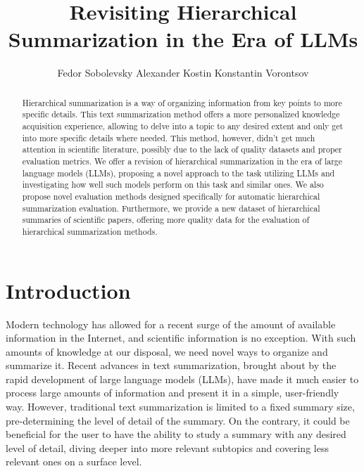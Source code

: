\documentclass[11pt,a4paper]{article}
\title{\LARGE \bf
Revisiting Hierarchical Summarization in the Era of LLMs
}
\author{
  Fedor Sobolevsky \And Alexander Kostin \And Konstantin Vorontsov
}
\begin{document}
\maketitle


\begin{abstract}

Hierarchical summarization is a way of organizing information from key points to more specific details. This text summarization method offers a more personalized knowledge acquisition experience, allowing to delve into a topic to any desired extent and only get into more specific details where needed. This method, however, didn't get much attention in scientific literature, possibly due to the lack of quality datasets and proper evaluation metrics. We offer a revision of hierarchical summarization in the era of large language models (LLMs), proposing a novel approach to the task utilizing LLMs and investigating how well such models perform on this task and similar ones. We also propose novel evaluation methods designed specifically for automatic hierarchical summarization evaluation. Furthermore, we provide a new dataset of hierarchical summaries of scientific papers, offering more quality data for the evaluation of hierarchical summarization methods.

\end{abstract}


\section{Introduction}

Modern technology has allowed for a recent surge of the amount of available information in the Internet, and scientific information is no exception. With such amounts of knowledge at our disposal, we need novel ways to organize and summarize it. Recent advances in text summarization, brought about by the rapid development of large language models (LLMs), have made it much easier to process large amounts of information and present it in a simple, user-friendly way. However, traditional text summarization is limited to a fixed summary size, pre-determining the level of detail of the summary. On the contrary, it could be beneficial for the user to have the ability to study a summary with any desired level of detail, diving deeper into more relevant subtopics and covering less relevant ones on a surface level.
\end{document}
